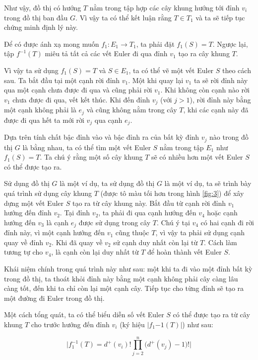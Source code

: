 \documentclass[14pt, a4paper]{article}
\numberwithin{equation}{section}
\numberwithin{figure}{section}
\numberwithin{dl}{section}
\numberwithin{md}{section}
\numberwithin{bd}{section}
\numberwithin{dn}{section}
\numberwithin{hq}{section}
\begin{document}
    Như vậy, đồ thị có hướng $T$ nằm trong tập hợp các cây khung hướng tới đỉnh $v_i$ trong đồ thị ban đầu $G$.
    Vì vậy ta có thể kết luận rằng $T \in T_1$ và ta sẽ tiếp tục chứng minh định lý này.

    Để có được ánh xạ mong muốn $f_1: E_1 \rightarrow T_1$, ta phải đặt $f_1(S) = T$.
    Ngược lại, tập $f^{-1} (T)$ miêu tả tất cả các vết Euler đi qua đỉnh $v_1$ tạo ra cây khung $T$.

    Vì vậy ta sử dụng $f_1(S)=T$ và $S \in E_1$, ta có thể vẽ một vết Euler $S$ theo cách sau.
    Ta bắt đầu tại một cạnh rời đỉnh $v_1$. Một khi quay lại $v_1$ ta sẽ rời đỉnh này qua một cạnh chưa được đi qua và cũng phải rời $v_1$.
    Khi không còn cạnh nào rời $v_1$ chưa được đi qua, vết kết thúc.
    Khi đến đỉnh $v_j$ (với $j > 1$), rời đỉnh này bằng một cạnh không phải là $e_j$ và cũng không nằm trong cây $T$, khi các cạnh này đã được đi qua hết ta mới rời $v_j$ qua cạnh $e_j$.

    Dựa trên tính chất bậc đỉnh vào và bậc đỉnh ra của bất kỳ đỉnh $v_j$ nào trong đồ thị $G$ là bằng nhau, ta có thể tìm một vết Euler $S$ nằm trong tập $E_1$ như $f_1(S)=T$.
    Ta chú ý rằng một số cây khung $T$ sẽ có nhiều hơn một vết Euler $S$ có thể được tạo ra.

    Sử dụng đồ thị $G$ là một ví dụ, ta sử dụng đồ thị $G$ là một ví dụ, ta sẽ trình bày quá trình sử dụng cây khung $T$ (được tô màu tối hơn trong hình \ref{fig:3}) để xây dựng một vết Euler $S$ tạo ra từ cây khung này.
    Bắt đầu từ cạnh rời đỉnh $v_1$ hướng đến đỉnh $v_2$. Tại đỉnh $v_2$, ta phải đi qua cạnh hướng đến $v_4$ hoặc cạnh hướng đến $v_3$ là cạnh $e_j$ được sử dụng trong cây $T$.
    Chú ý tại $v_4$ có hai cạnh đi rời đỉnh này, vì một cạnh hướng đến $v_1$ cũng thuộc $T$, vì vậy ta phải sử dụng cạnh quay về đỉnh $v_2$.
    Khi đã quay về $v_2$ sử cạnh duy nhất còn lại từ $T$.
    Cách làm tương tự cho $v_4$, là cạnh còn lại duy nhất từ $T$ để hoàn thành vết Euler $S$.

    Khái niệm chính trong quá trình này như sau: một khi ta đi vào một đỉnh bất kỳ trong đồ thị, ta thoát khỏi đỉnh này bằng một cạnh không phải cây càng lâu càng tốt, đến khi ta chỉ còn lại một cạnh cây.
    Tiếp tục cho từng đỉnh sẽ tạo ra một đường đi Euler trong đồ thị.

    Một cách tổng quát, ta có thể biểu diễn số vết Euler $S$ có thể được tạo ra từ cây khung $T$ cho trước hướng đến đỉnh $v_i$ (ký hiệu $\lvert f_1{-1} (T) \rvert$) như sau:

    \begin{equation}
        \lvert f_1^{-1} (T) = d^+ (v_i)! \prod_{j=2}^n \big( d^+ (v_j) - 1 \big) ! \rvert
    \end{equation}
\end{document}

